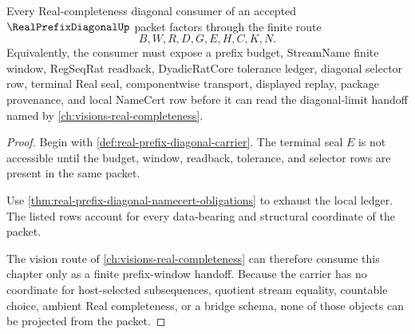 \begin{theorem}
\label{thm:real-prefix-diagonal-limit-route}
Every Real-completeness diagonal consumer of an accepted $\RealPrefixDiagonalUp$ packet factors through the finite route
$$
B,W,R,D,G,E,H,C,K,N .
$$
Equivalently, the consumer must expose a prefix budget, StreamName finite window, RegSeqRat readback, DyadicRatCore tolerance ledger, diagonal selector row, terminal Real seal, componentwise transport, displayed replay, package provenance, and local NameCert row before it can read the diagonal-limit handoff named by \autoref{ch:visions-real-completeness}.
\end{theorem}
\begin{proof}
Begin with \autoref{def:real-prefix-diagonal-carrier}. The terminal seal $E$ is not accessible until the budget, window, readback, tolerance, and selector rows are present in the same packet.

Use \autoref{thm:real-prefix-diagonal-namecert-obligations} to exhaust the local ledger. The listed rows account for every data-bearing and structural coordinate of the packet.

The vision route of \autoref{ch:visions-real-completeness} can therefore consume this chapter only as a finite prefix-window handoff. Because the carrier has no coordinate for host-selected subsequences, quotient stream equality, countable choice, ambient Real completeness, or a bridge schema, none of those objects can be projected from the packet.
\end{proof}


\begin{closurestatus}{\RealPrefixDiagonalUp}
  \theoryclosure{\seedClosure}
  \formalstatus{\unformalizedV}
\end{closurestatus}

